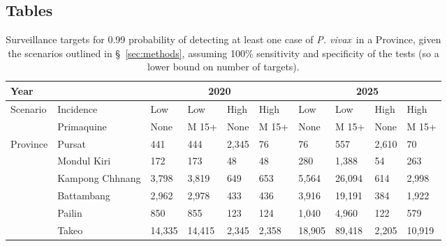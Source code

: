 \documentclass[doublespacing]{bmcart}
\newcommand{\pv}{\textit{P. vivax}}
\begin{document}
\begin{backmatter}

\section*{Tables}
\begin{table}[h!] 
\caption{Surveillance targets for 0.99 probability of detecting at least one case of \pv~in a Province, given the scenarios outlined in \S~\ref{sec:methods}, assuming 100\% sensitivity and specificity of the tests (so a lower bound on number of targets).}\label{tab:surveillance}
      \begin{tabular}{|l|l|l|l|l|l|l|l|l|l|}
       \hline 
       \multicolumn{2}{|l|}{Year} & \multicolumn{4}{|c|}{2020} & \multicolumn{4}{|c|}{2025} \\ \hline
       \multirow{2}{*}{Scenario} & Incidence & Low & Low & High & High & Low & Low & High & High \\ %
                                 & Primaquine & None & M 15+ & None & M 15+ & None & M 15+ & None & M 15+ \\ \hline
    \multirow{6}{*}{Province} & Pursat & 441 & 444 & 2,345 & 76 & 76 & 557 & 2,610 & 70 \\ %
                              & Mondul Kiri & 172 & 173 & 48 & 48 & 280 & 1,388 & 54 & 263 \\ %
                              & Kampong Chhnang & 3,798 & 3,819 & 649 & 653 & 5,564 & 26,094 & 614 & 2,998 \\ %
                              & Battambang & 2,962 & 2,978 & 433 & 436 & 3,916 & 19,191 & 384 & 1,922 \\ %
                              & Pailin & 850 & 855 & 123 & 124 & 1,040 & 4,960 & 122 & 579 \\ %
                              & Takeo & 14,335 & 14,415 & 2,345 & 2,358 & 18,905 & 89,418 & 2,205 & 10,919 \\ \hline 
      \end{tabular}
\end{table}



\end{backmatter}
\end{document}

